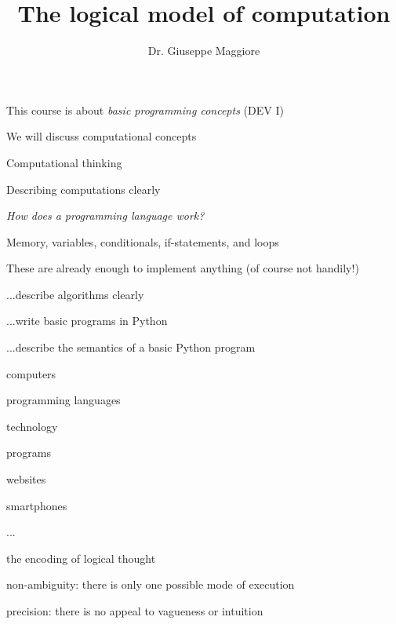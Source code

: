 \documentclass{beamer}
\title{The logical model of computation}
\author{Dr. Giuseppe Maggiore}
\institute{Hogeschool Rotterdam \\ 
Rotterdam, Netherlands}
\date{}
\begin{document}
\maketitle

\begin{slide}{
\item This course is about \textit{basic programming concepts} (DEV I)
\item We will discuss computational concepts
\item Computational thinking
\item Describing computations clearly
}\end{slide}

\begin{slide}{
\item \textit{How does a programming language work?}
\item Memory, variables, conditionals, if-statements, and loops
\item These are already enough to implement anything (of course not handily!)
}\end{slide}

\begin{slide}{
\item ...describe algorithms clearly
\item ...write basic programs in Python
\item ...describe the semantics of a basic Python program
}\end{slide}

\begin{slide}{
\item computers
\item programming languages
\item technology
\item programs
\item websites
\item smartphones
\item ...
}\end{slide}

\begin{slide}{
\item the encoding of logical thought
\item non-ambiguity: there is only one possible mode of execution
\item precision: there is no appeal to vagueness or intuition
}\end{slide}
\end{document}
